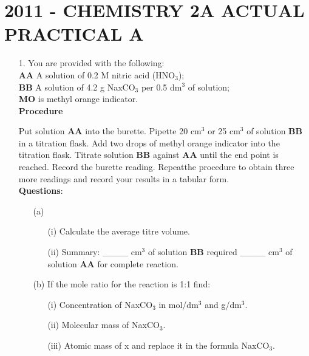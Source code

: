 \section{2011 - CHEMISTRY 2A ACTUAL PRACTICAL A} 

\begin{enumerate}
\item[1.] You are provided with the following:\\
\textbf{AA}  A solution of 0.2 M nitric acid (HNO$_3$);\\
\textbf{BB}  A solution of 4.2 g NaxCO$_3$ per 0.5 dm$^3$ of solution;\\
\textbf{MO} is methyl orange indicator.\\

\textbf{Procedure}\\
\vspace{-10pt}

Put solution \textbf{AA} into the burette. Pipette 20 cm$^3$ or 25 cm$^3$ of solution \textbf{BB} in a titration flask. Add two drops of methyl orange indicator into the titration flask. Titrate solution \textbf{BB} against \textbf{AA} until the end point is reached. Record the burette reading. Repeatthe procedure to obtain three more readings and record your results in a tabular form.\\[10pt]
\vspace{-10pt}
\textbf{Questions}:\\
\vspace{-6pt}
\begin{enumerate}
\item[(a)] 
\begin{enumerate}
\item[(i)] Calculate the average titre volume.
\item[(ii)] Summary:  \_\_\_\_ cm$^3$ of solution \textbf{BB} required \_\_\_\_ cm$^3$ of solution \textbf{AA} for complete reaction.
\end{enumerate}
\vspace{-2pt}
\item[(b)] If the mole ratio for the reaction is 1:1 find:\\
\vspace{-10pt}
\begin{enumerate}
\item[(i)] Concentration of NaxCO$_3$ in mol/dm$^3$ and g/dm$^3$.
\item[(ii)] Molecular mass of NaxCO$_3$.
\item[(iii)] Atomic mass of x and replace it in the formula NaxCO$_3$.
\end{enumerate}


\end{enumerate}
\end{enumerate}
